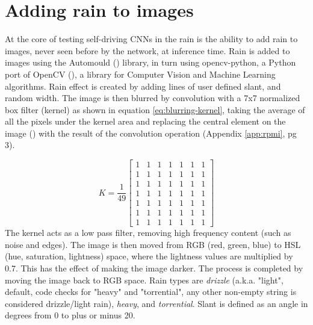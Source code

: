 
\section{Adding rain to images}
\label{methods:AddingRainToImages}
At the core of testing self-driving CNNs in the rain is the ability to add rain to images, never seen before by the network, at inference time.
Rain is added to images using the Automould (\cite{Saxena2017}) library, in turn using opencv-python, a Python port of OpenCV (\cite{mordvintsev2014opencv}), a library for Computer Vision and Machine Learning algorithms. Rain effect is created by adding lines of user defined slant, and random width. The image is then blurred by convolution with a 7x7 normalized box filter (kernel) as shown in equation \ref{eq:blurring-kernel}, taking the average of all the pixels under the kernel area and replacing the central element on the image (\cite{documentationOpenCV2020}) with the result of the convolution operation (Appendix \ref{app:rpmi}, pg 3).

\begin{equation}
\label{eq:blurring-kernel}
    K = \frac{1}{49} \begin{bmatrix} 1 & 1 & 1 & 1 & 1 & 1 & 1 \\ 
    1 & 1 & 1 & 1 & 1 & 1 & 1 \\ 
    1 & 1 & 1 & 1 & 1 & 1 & 1 \\ 
    1 & 1 & 1 & 1 & 1 & 1 & 1 \\ 
    1 & 1 & 1 & 1 & 1 & 1 & 1 \\ 
    1 & 1 & 1 & 1 & 1 & 1 & 1 \\ 
    1 & 1 & 1 & 1 & 1 & 1 & 1 \end{bmatrix}
\end{equation}
The kernel acts as a low pass filter, removing high frequency content (such as noise and edges). The image is then moved from RGB (red, green, blue) to HSL (hue, saturation, lightness) space, where the lightness values are multiplied by 0.7. This has the effect of making the image darker. The process is completed by moving the image back to RGB space. Rain types are \textit{drizzle} (a.k.a. "light", default, code checks for "heavy" and "torrential", any other non-empty string is considered drizzle/light rain), \textit{heavy}, and \textit{torrential}. Slant is defined as an angle in degrees from 0 to plus or minus 20.

